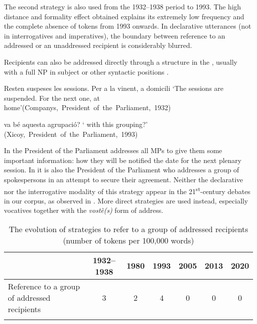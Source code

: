 \documentclass[output=paper]{langscibook}
\begin{document}
The second strategy is also used from the 1932–1938 period to 1993. The high distance and formality effect obtained explains its extremely low frequency and the complete absence of tokens from 1993 onwards. In declarative utterances (not in interrogatives and imperatives), the boundary between reference to an addressed or an unaddressed recipient is considerably blurred.



\label{sec:nogue:2.2.1.8}





Recipients can also be addressed directly through a structure in the , usually with a full NP in subject or other syntactic positions .

\ea\label{ex:nogue:31}
\ea\label{ex:nogue:31a}
{{Resten suspeses les sessions. Per a la vinent,}  {a domicili}}
\glt `The sessions are suspended. For the next one,      at home'\hfill\hbox{(Companys, President of the Parliament, 1932)}

\ex\label{ex:nogue:31b}

{ {va bé aquesta agrupació?}}
\glt `     with this grouping?'\\
\hfill\hbox{(Xicoy, President of the Parliament, 1993)}
\z \z 


In  the President of the Parliament addresses all MPs to give them some important information: how they will be notified the date for the next plenary session. In  it is also the President of the Parliament who addresses a group of spokespersons in an attempt to secure their agreement. Neither the declarative  nor the interrogative  modality of this strategy appear in the 21\textsuperscript{st}{}-century debates in our corpus, as observed in . More direct strategies are used instead, especially vocatives together with the \textit{vostè(s)} form of address.


\begin{table}
\begin{tabularx}{\textwidth}{Qcccccc}
\lsptoprule
& 1932–1938 & 1980 & 1993 & 2005 & 2013 & 2020\\
\midrule
Reference to a group of addressed recipients & 3 & 2 & 4 & 0 & 0 & 0\\
\lspbottomrule
\end{tabularx}
\caption{The evolution of  strategies to refer to a group of addressed recipients (number of tokens per 100,000 words)\label{tab:nogue:14}}
\end{table}
\end{document}
